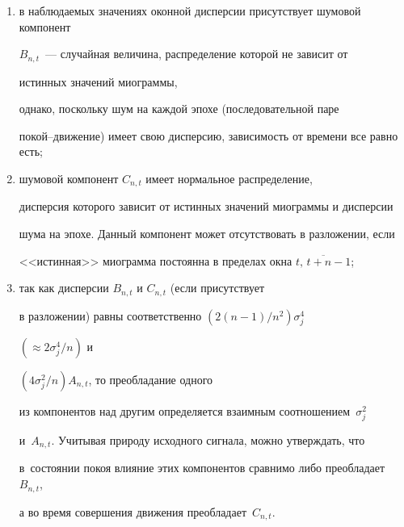 \begin{enumerate}[(1)]


    \item в наблюдаемых значениях оконной дисперсии присутствует шумовой компонент


    $B_{n,t}$~--- случайная величина, распределение которой не зависит от


    истинных значений миограммы,


    однако, поскольку шум на каждой эпохе (последовательной паре


    по\-кой--дви\-же\-ние) имеет свою дисперсию, зависимость от времени все равно есть;


    \item шумовой компонент $C_{n,t}$ имеет нормальное распределение,


    дисперсия которого зависит от истинных значений миограммы и дисперсии


    шума на эпохе. Данный компонент может отсутствовать в разложении, если


    <<истинная>> миограмма постоянна в пределах окна $\overline{t,\, t+n-1}$;


    \item так как дисперсии $B_{n,t}$ и $C_{n,t}$ (если присутствует


    в разложении) равны соответственно $({2(n-1)}/{n^2})\sigma^4_j$


    $\left(\approx {2\sigma^4_j}/{n}\right)$ и


    $(4\sigma^2_j/n)A_{n,t}$, то преобладание одного


    из компонентов над другим определяется взаимным соотношением~$\sigma^2_j$


    и~$A_{n,t}$. Учитывая природу исходного сигнала, можно утверждать, что


    в~состоянии покоя влияние этих компонентов сравнимо либо преобладает~$B_{n,t}$,


    а во время совершения движения преобладает~$C_{n,t}$.


\end{enumerate}


